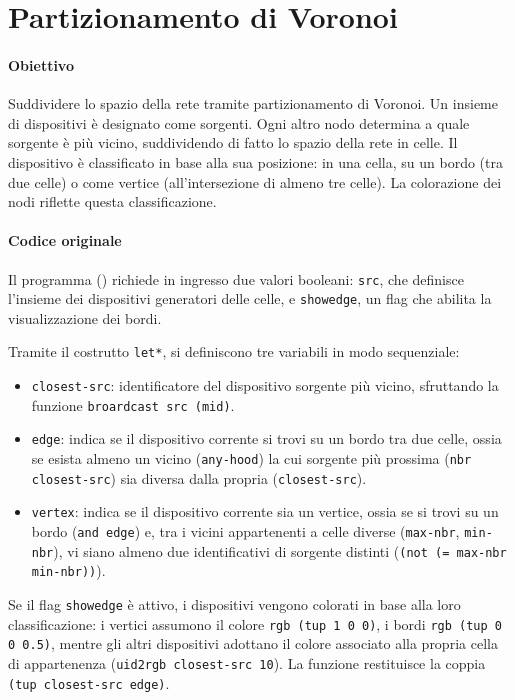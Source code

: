 \newpage
\section{Partizionamento di Voronoi}
\label{sec:voronoi}

\paragraph{Obiettivo} Suddividere lo spazio della rete tramite partizionamento di Voronoi.
%
Un insieme di dispositivi è designato come sorgenti.
%
Ogni altro nodo determina a quale sorgente è più vicino, suddividendo di fatto lo spazio della rete in celle. 
%
Il dispositivo è classificato in base alla sua posizione: in una cella, su un bordo (tra due celle) o come vertice (all'intersezione di almeno tre celle).
%
La colorazione dei nodi riflette questa classificazione.

\paragraph{Codice originale} Il programma () richiede in ingresso due valori booleani: \texttt{src}, che definisce l'insieme dei dispositivi generatori delle celle, e \texttt{showedge}, un flag che abilita la visualizzazione dei bordi.
%

%
Tramite il costrutto \texttt{let*}, si definiscono tre variabili in modo sequenziale:
\begin{itemize}
    \item \texttt{closest-src}: identificatore del dispositivo sorgente più vicino, sfruttando la funzione \texttt{broardcast src (mid)}.
    \item \texttt{edge}: indica se il dispositivo corrente si trovi su un bordo tra due celle, ossia se esista almeno un vicino (\texttt{any-hood}) la cui sorgente più prossima (\texttt{nbr closest-src}) sia diversa dalla propria (\texttt{closest-src}).
    \item \texttt{vertex}: indica se il dispositivo corrente sia un vertice, ossia se si trovi su un bordo (\texttt{and edge}) e, tra i vicini appartenenti a celle diverse (\texttt{max-nbr}, \texttt{min-nbr}), vi siano almeno due identificativi di sorgente distinti (\texttt{(not (= max-nbr min-nbr))}).
\end{itemize}
%
Se il flag \texttt{showedge} è attivo, i dispositivi vengono colorati in base alla loro classificazione: i vertici assumono il colore \texttt{rgb (tup 1 0 0)}, i bordi \texttt{rgb (tup 0 0 0.5)}, mentre gli altri dispositivi adottano il colore associato alla propria cella di appartenenza (\texttt{uid2rgb closest-src 10}).
%
La funzione restituisce la coppia \texttt{(tup closest-src edge)}.

